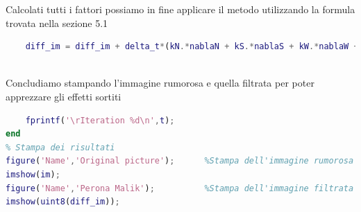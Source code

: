 Calcolati tutti i fattori possiamo in fine applicare il metodo utilizzando la formula trovata nella sezione 5.1
\begin{lstlisting}[language=MATLAB, name=listato]
    % Soluzione discreta della PDE.
    diff_im = diff_im + delta_t*(kN.*nablaN + kS.*nablaS + kW.*nablaW + kE.*nablaE );
          
\end{lstlisting}
Concludiamo stampando l'immagine rumorosa e quella filtrata per poter apprezzare gli effetti sortiti
\begin{lstlisting}[language=MATLAB, name=listato]
    % Stampa di controllo
    fprintf('\rIteration %d\n',t);
end
% Stampa dei risultati
figure('Name','Original picture');      %Stampa dell'immagine rumorosa
imshow(im);
figure('Name','Perona Malik');          %Stampa dell'immagine filtrata
imshow(uint8(diff_im));

\end{lstlisting}

